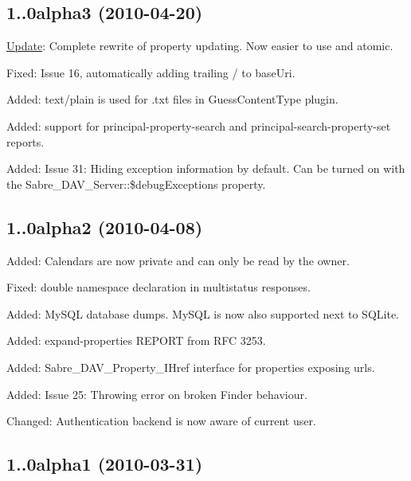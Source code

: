 \subsection*{1..\+0alpha3 (2010-\/04-\/20) }


\begin{DoxyItemize}
\item \mbox{\hyperlink{class_update}{Update}}\+: Complete rewrite of property updating. Now easier to use and atomic.
\item Fixed\+: Issue 16, automatically adding trailing / to base\+Uri.
\item Added\+: text/plain is used for .txt files in Guess\+Content\+Type plugin.
\item Added\+: support for principal-\/property-\/search and principal-\/search-\/property-\/set reports.
\item Added\+: Issue 31\+: Hiding exception information by default. Can be turned on with the Sabre\+\_\+\+D\+A\+V\+\_\+\+Server\+::\$debug\+Exceptions property.
\end{DoxyItemize}

\subsection*{1..\+0alpha2 (2010-\/04-\/08) }


\begin{DoxyItemize}
\item Added\+: Calendars are now private and can only be read by the owner.
\item Fixed\+: double namespace declaration in multistatus responses.
\item Added\+: My\+S\+QL database dumps. My\+S\+QL is now also supported next to S\+Q\+Lite.
\item Added\+: expand-\/properties R\+E\+P\+O\+RT from R\+FC 3253.
\item Added\+: Sabre\+\_\+\+D\+A\+V\+\_\+\+Property\+\_\+\+I\+Href interface for properties exposing urls.
\item Added\+: Issue 25\+: Throwing error on broken Finder behaviour.
\item Changed\+: Authentication backend is now aware of current user.
\end{DoxyItemize}

\subsection*{1..\+0alpha1 (2010-\/03-\/31) }


